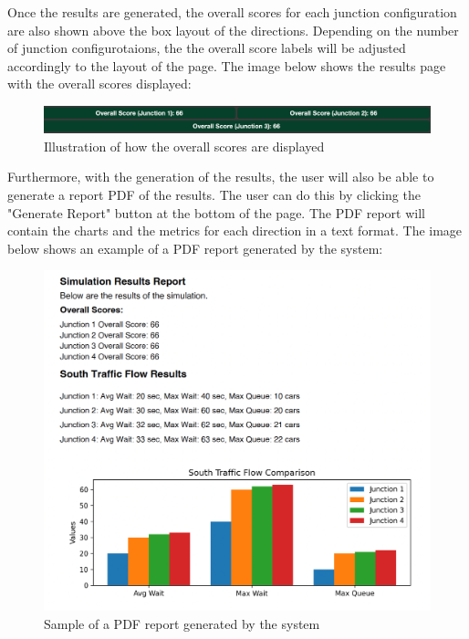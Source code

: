 \documentclass{article}
\begin{document}
        Once the results are generated, the overall scores for each junction configuration are also shown above the box layout of the directions. Depending on the number of junction configurotaions, the 
        the overall score labels will be adjusted accordingly to the layout of the page. The image below shows the results page with the overall scores displayed:

        \begin{figure}[H]
            \centering
            \includegraphics[width=\textwidth]{overallScores.png}
            \caption{Illustration of how the overall scores are displayed} 
            \label{fig:overallScores}
        \end{figure}

        Furthermore, with the generation of the results, the user will also be able to generate a report PDF of the results. The user can do this by clicking the "Generate Report" button at the bottom of the page. 
        The PDF report will contain the charts and the metrics for each direction in a text format. The image below shows an example of a PDF report generated by the system:

        \begin{figure}[H]
            \centering
            \includegraphics[width=\textwidth]{samplePDF.png}
            \caption{Sample of a PDF report generated by the system} 
            \label{fig:samplePDF}
        \end{figure}
\end{document}
